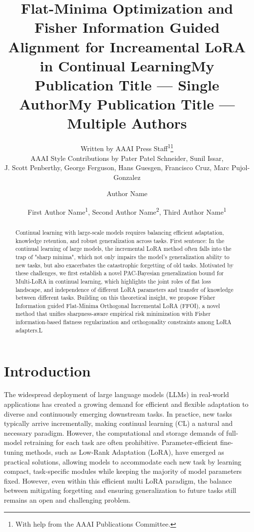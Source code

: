 \documentclass[letterpaper]{article} %
\title{Flat-Minima Optimization and Fisher Information Guided Alignment for Increamental LoRA in Continual Learning}
\author{
    Written by AAAI Press Staff\textsuperscript{\rm 1}\thanks{With help from the AAAI Publications Committee.}\\
    AAAI Style Contributions by Pater Patel Schneider,
    Sunil Issar,\\
    J. Scott Penberthy,
    George Ferguson,
    Hans Guesgen,
    Francisco Cruz\equalcontrib,
    Marc Pujol-Gonzalez\equalcontrib
}
\title{My Publication Title --- Single Author}
\author {
    Author Name
}
\title{My Publication Title --- Multiple Authors}
\author {
    First Author Name\textsuperscript{\rm 1},
    Second Author Name\textsuperscript{\rm 2},
    Third Author Name\textsuperscript{\rm 1}
}
\newcommand{\LYY}[1]{{\color{magenta}{\bf LYY:} #1}}
\begin{document}
\maketitle

\begin{abstract}
Continual learning with large-scale models requires balancing efficient adaptation, knowledge retention, and robust generalization across tasks.
\LYY{First sentence: In the continual learning of large models, the incremental LoRA method often falls into the trap of "sharp minima", which not only impairs the model's generalization ability to new tasks, but also exacerbates the catastrophic forgetting of old tasks.} Motivated by these challenges, we first establish a novel PAC-Bayesian generalization bound for Multi-LoRA in continual learning, which highlights the joint roles of flat loss landscape, and independence of different LoRA   parameters and transfer of knowledge between different tasks. Building on this theoretical insight, we propose Fisher Information guided Flat-Minima Orthogonal Incremental LoRA (FFOI), a novel method that unifies sharpness-aware empirical risk minimization with Fisher information-based flatness regularization and orthogonality constraints among LoRA adapters.L
\end{abstract}


\section{Introduction}

The widespread deployment of large language models (LLMs) in real-world applications has created a growing demand for efficient and flexible adaptation to diverse and continuously emerging downstream tasks. In practice, new tasks typically arrive incrementally, making continual learning (CL) a natural and necessary paradigm. However, the computational and storage demands of full-model retraining for each task are often prohibitive. Parameter-efficient fine-tuning methods, such as Low-Rank Adaptation (LoRA), have emerged as practical solutions, allowing models to accommodate each new task by learning compact, task-specific modules while keeping the majority of model parameters fixed. However, even within this efficient multi LoRA paradigm, the balance between mitigating forgetting and ensuring generalization to future tasks still remains an open and challenging problem.
\end{document}
